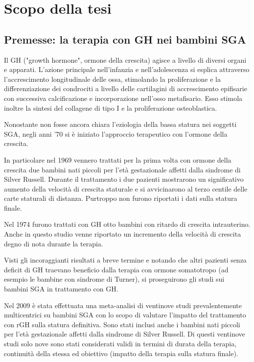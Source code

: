  \chapter{Scopo della tesi}

\section{Premesse: la terapia con GH nei bambini SGA}


Il GH ("growth hormone", ormone della crescita) agisce a livello di diversi organi e apparati.
L'azione principale nell'infanzia e nell'adolescenza si esplica attraverso l'accrescimento
longitudinale delle ossa, stimolando la proliferazione e la differenziazione dei condrociti
a livello delle cartilagini di accrescimento epifisarie con successiva calcificazione
e incorporazione nell'osso metafisario. Esso stimola inoltre la sintesi del collagene 
di tipo I e la proliferazione osteoblastica.\cite{sga}


Nonostante non fosse ancora chiara l'eziologia della bassa statura nei soggetti SGA,
negli anni '70 si è iniziato l'approccio terapeutico con l'ormone della crescita.

In particolare nel 1969 vennero trattati per la prima volta con ormone della crescita  due bambini nati piccoli per l'età gestazionale affetti dalla sindrome di Silver Russell. Durante il trattamento i due pazienti mostrarono un significativo aumento della velocità di crescita staturale e si avvicinarono al terzo centile delle carte staturali di distanza. Purtroppo non furono riportati i dati sulla statura finale\cite{tanner1969low}.

Nel 1974 furono trattati con GH otto bambini con ritardo di crescita intrauterino. Anche in questo studio venne riportato un incremento della velocità di crescita degno di nota durante la terapia\cite{lee1974growth}.


Visti gli incoraggianti risultati a breve termine e notando che altri pazienti senza deficit di GH traevano beneficio dalla terapia con ormone somatotropo (ad esempio le bambine con sindrome di Turner\cite{betts1999decade}),
si proseguirono gli studi sui bambini SGA in trattamento con GH.


Nel 2009 è stata effettuata una meta-analisi di ventinove studi prevalentemente multicentrici su bambini SGA  con lo scopo di valutare l'impatto del trattamento con rGH sulla statura definitiva. Sono stati inclusi anche i bambini nati piccoli per l'età gestazionale  affetti dalla sindrome di Silver Russell. Di questi ventinove studi solo nove sono stati considerati validi in termini di durata della terapia, continuità della stessa ed obiettivo (impatto della terapia sulla statura finale)\cite{maiorana2009impact}.

